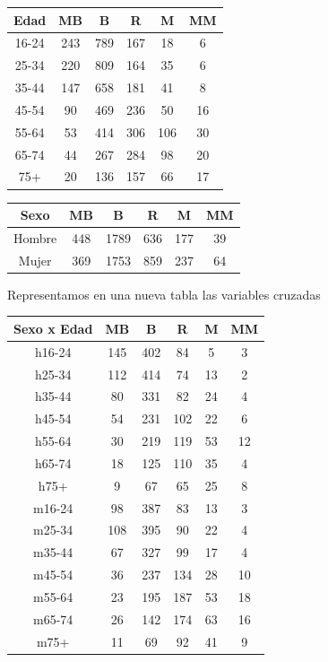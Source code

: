 \begin{itemize}
    \begin{tabular}{|c|c|c|c|c|c|}
        \hline
        Edad    &  MB  &  B  &  R  &  M  &  MM  \\
        \hline
        16-24   &  243 & 789 & 167 &  18 &    6 \\
        25-34   &  220 & 809 & 164 &  35 &    6 \\
        35-44   &  147 & 658 & 181 &  41 &    8 \\
        45-54   &   90 & 469 & 236 &  50 &   16 \\
        55-64   &   53 & 414 & 306 & 106 &   30 \\
        65-74   &   44 & 267 & 284 &  98 &   20 \\
        75+     &   20 & 136 & 157 &  66 &   17 \\
        \hline
    \end{tabular}
    \smallskip
    \begin{tabular}{|c|c|c|c|c|c|}
        \hline
        Sexo    &  MB  &   B  &  R  &  M  &  MM  \\
        \hline
        Hombre  &  448 & 1789 & 636 & 177 &   39 \\
        Mujer   &  369 & 1753 & 859 & 237 &   64 \\
        \hline
    \end{tabular}
    
    Representamos en una nueva tabla las variables cruzadas

    \begin{center}
        \begin{tabular}{|c|c|c|c|c|c|}
            \hline
            Sexo x Edad &  MB  &  B  &  R  &  M  &  MM  \\
            \hline
            h16-24      &  145 & 402 &  84 &   5 &   3 \\
            h25-34      &  112 & 414 &  74 &  13 &   2 \\
            h35-44      &   80 & 331 &  82 &  24 &   4 \\
            h45-54      &   54 & 231 & 102 &  22 &   6 \\
            h55-64      &   30 & 219 & 119 &  53 &  12 \\
            h65-74      &   18 & 125 & 110 &  35 &   4 \\
            h75+        &    9 &  67 &  65 &  25 &   8 \\
            m16-24      &   98 & 387 &  83 &  13 &   3 \\
            m25-34      &  108 & 395 &  90 &  22 &   4 \\
            m35-44      &   67 & 327 &  99 &  17 &   4 \\
            m45-54      &   36 & 237 & 134 &  28 &  10 \\
            m55-64      &   23 & 195 & 187 &  53 &  18 \\
            m65-74      &   26 & 142 & 174 &  63 &  16 \\
            m75+        &   11 &  69 &  92 &  41 &   9 \\
            \hline
        \end{tabular}
    \end{center}
    

\end{itemize}
